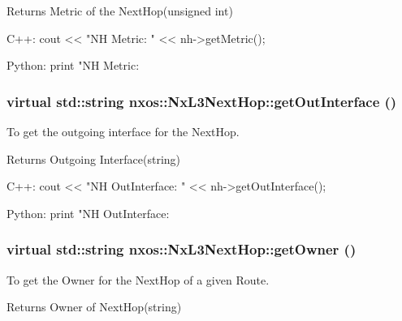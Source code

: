 \begin{DoxyReturn}{Returns}
Metric of the NextHop(unsigned int)
\end{DoxyReturn}

\begin{DoxyCode}
  C++:
       cout << "NH Metric: " << nh->getMetric();

  Python:
       print "NH Metric: %
\end{DoxyCode}
 \hypertarget{classnxos_1_1NxL3NextHop_a768953432b23d2d35cb6d5ff1b47cfa2}{
\subsubsection[{getOutInterface}]{\setlength{\rightskip}{0pt plus 5cm}virtual std::string nxos::NxL3NextHop::getOutInterface ()}}
\label{classnxos_1_1NxL3NextHop_a768953432b23d2d35cb6d5ff1b47cfa2}
To get the outgoing interface for the NextHop.

\begin{DoxyReturn}{Returns}
Outgoing Interface(string)
\end{DoxyReturn}

\begin{DoxyCode}
  C++:
       cout << "NH OutInterface: " << nh->getOutInterface();

  Python:
       print "NH OutInterface: %
\end{DoxyCode}
 \hypertarget{classnxos_1_1NxL3NextHop_a03ae40373ad9be88b6a18e7119aff080}{
\subsubsection[{getOwner}]{\setlength{\rightskip}{0pt plus 5cm}virtual std::string nxos::NxL3NextHop::getOwner ()}}
\label{classnxos_1_1NxL3NextHop_a03ae40373ad9be88b6a18e7119aff080}
To get the Owner for the NextHop of a given Route.

\begin{DoxyReturn}{Returns}
Owner of NextHop(string)
\end{DoxyReturn}

